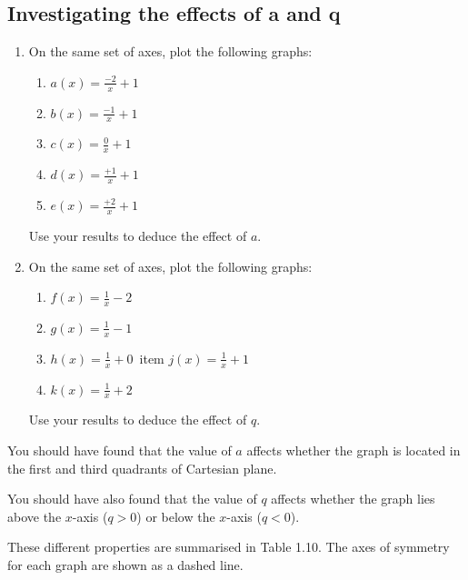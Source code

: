 \subsection*{ Investigating the effects of a and q }
\nopagebreak
\begin{enumerate}[noitemsep, label=\textbf{\arabic*}. ] 
\item On the same set of axes, plot the following graphs:
\begin{enumerate}[noitemsep, label=\textbf{\alph*}. ] 
\item $a(x)=\frac{-2}{x}+1$
\item $b(x)=\frac{-1}{x}+1$
\item $c(x)=\frac{0}{x}+1$
\item $d(x)=\frac{+1}{x}+1$
\item $e(x)=\frac{+2}{x}+1$\end{enumerate}
Use your results to deduce the effect of $a$.
\item On the same set of axes, plot the following graphs:
\begin{enumerate}[noitemsep, label=\textbf{\alph*}. ] 
\item $f(x)=\frac{1}{x}-2$
\item $g(x)=\frac{1}{x}-1$
\item $h(x)=\frac{1}{x}+0$\
item $j(x)=\frac{1}{x}+1$
\item $k(x)=\frac{1}{x}+2$\end{enumerate}
Use your results to deduce the effect of $q$.
\end{enumerate}
You should have found that the value of $a$ affects whether the graph is located in the first and third quadrants of Cartesian plane.\par 
You should have also found that the value of $q$ affects whether the graph lies above the $x$-axis ($q>0$) or below the $x$-axis ($q<0$).\par 
These different properties are summarised in Table 1.10. The axes of symmetry for each graph are shown as a dashed line.\par 
